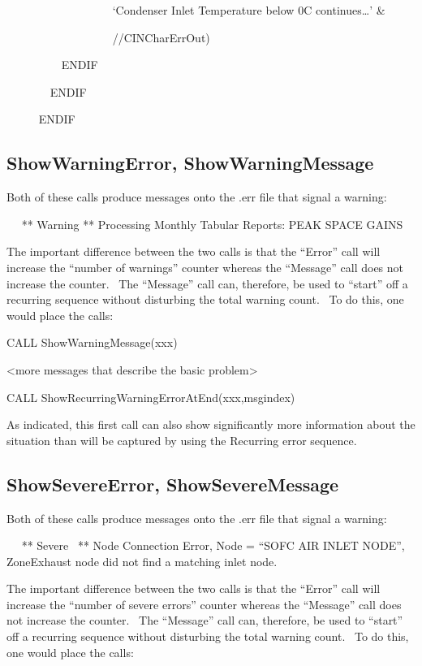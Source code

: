 ~~~~~~~~~~~~~~~~~~ `Condenser Inlet Temperature below 0C continues\ldots{}' \&

~~~~~~~~~~ ~~~~~~~~//CINCharErrOut)

~~~~~~~~~ ENDIF

~~~~~~~ ENDIF

~~~~~ ENDIF

\subsection{ShowWarningError, ShowWarningMessage}\label{showwarningerror-showwarningmessage}

Both of these calls produce messages onto the .err file that signal a warning:

~~ ** Warning ** Processing Monthly Tabular Reports: PEAK SPACE GAINS

The important difference between the two calls is that the ``Error'' call will increase the ``number of warnings'' counter whereas the ``Message'' call does not increase the counter.~ The ``Message'' call can, therefore, be used to ``start'' off a recurring sequence without disturbing the total warning count.~ To do this, one would place the calls:

CALL ShowWarningMessage(xxx)

\textless{}more messages that describe the basic problem\textgreater{}

CALL ShowRecurringWarningErrorAtEnd(xxx,msgindex)

As indicated, this first call can also show significantly more information about the situation than will be captured by using the Recurring error sequence.

\subsection{ShowSevereError, ShowSevereMessage}\label{showsevereerror-showseveremessage}

Both of these calls produce messages onto the .err file that signal a warning:

~~ ** Severe~ ** Node Connection Error, Node = ``SOFC AIR INLET NODE'', ZoneExhaust node did not find a matching inlet node.

The important difference between the two calls is that the ``Error'' call will increase the ``number of severe errors'' counter whereas the ``Message'' call does not increase the counter.~ The ``Message'' call can, therefore, be used to ``start'' off a recurring sequence without disturbing the total warning count.~ To do this, one would place the calls:

